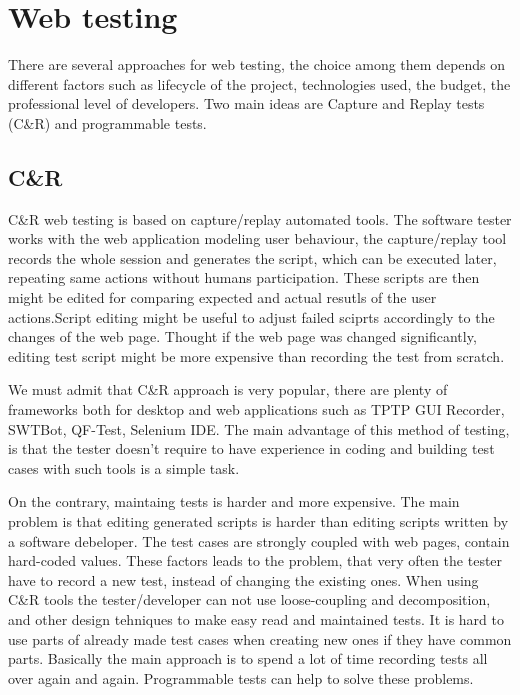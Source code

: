 	\chapter{Web testing}
	\label{ch:webtesting}

		There are several approaches for web testing, the choice among them depends on
		different factors such as lifecycle of the project, technologies used, the
		budget, the professional level of developers. Two main ideas are Capture and
		Replay tests (C\&R) and programmable tests.
		
		\section{C\&R}
		\label{sec:captureReplay}
			C\&R web testing is based on capture/replay automated
			tools. \cite{CaptureReplay7} The software tester works with the web
			application modeling user behaviour, the capture/replay tool records the
			whole session and generates the script, which can be executed later,
			repeating same actions without humans participation. These scripts are then
			might be edited for comparing expected and actual resutls of the user
			actions.Script editing might be useful to adjust failed sciprts accordingly
			to the changes of the web page. Thought if the web page was changed
			significantly, editing test script might be more expensive than recording the
			test from scratch. 
			
			We must admit that C\&R approach is very popular, there are plenty of
			frameworks both for desktop and web applications such as TPTP GUI Recorder, SWTBot, QF-Test,
			Selenium IDE.
			The main advantage of this method of testing, is that the tester doesn't
			require to have experience in coding and building test cases with such tools is a simple task. 
			
			On the contrary, maintaing tests is harder and more expensive.
			The main problem is that editing generated scripts is harder than editing
			scripts written by a software debeloper. The test cases are strongly coupled
			with web pages, contain hard-coded values. These factors leads to the
			problem, that very often the tester have to record a new test, instead of
			changing the existing ones. When using C\&R tools the tester/developer can
			not use loose-coupling and decomposition, and other design tehniques to make
			easy read and maintained tests. It is hard to use parts of already made test
			cases when creating new ones if they have common parts. Basically the main
			approach is to spend a lot of time recording tests all over again and again.
			Programmable tests can help to solve these problems.
			
